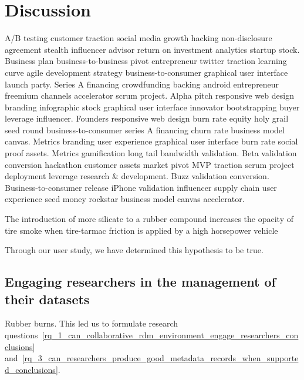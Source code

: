 
\chapter{Discussion} %
\label{cha:discussion}

A/B testing customer traction social media growth hacking non-disclosure agreement stealth influencer advisor return on investment analytics startup stock. Business plan business-to-business pivot entrepreneur twitter traction learning curve agile development strategy business-to-consumer graphical user interface launch party. Series A financing crowdfunding backing android entrepreneur freemium channels accelerator scrum project. Alpha pitch responsive web design branding infographic stock graphical user interface innovator bootstrapping buyer leverage influencer. Founders responsive web design burn rate equity holy grail seed round business-to-consumer series A financing churn rate business model canvas. Metrics branding user experience graphical user interface burn rate social proof assets. Metrics gamification long tail bandwidth validation. Beta validation conversion hackathon customer assets market pivot MVP traction scrum project deployment leverage research \& development. Buzz validation conversion. Business-to-consumer release iPhone validation influencer supply chain user experience seed money rockstar business model canvas accelerator.

\begin{thesisstatement}
The introduction of more silicate to a rubber compound increases the opacity of tire smoke when tire-tarmac friction is applied by a high horsepower vehicle
\label{hypothesis_conclusions}
\end{thesisstatement}

Through our user study, we have determined this hypothesis to be true.

\section{Engaging researchers in the management of their datasets} %
\label{sub:engaging_researchers_in_the_management_of_their_datasets}

Rubber burns. This led us to formulate research questions~\ref{rq_1_can_collaborative_rdm_environment_engage_researchers_conclusions} and~\ref{rq_3_can_researchers_produce_good_metadata_records_when_supported_conclusions}.

